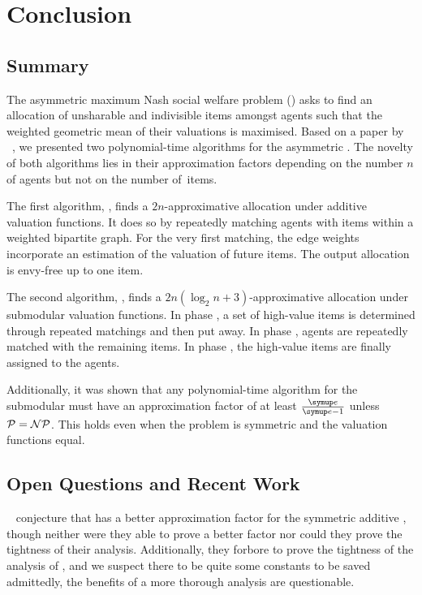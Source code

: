 \section{Conclusion}
\label{sec:conclusion}

\subsection{Summary}
\label{subsec:conclusion:summary}

The asymmetric maximum Nash social welfare problem (\NSW) asks to find an allocation of unsharable and indivisible items amongst agents such that the weighted geometric mean of their valuations is maximised.
Based on a paper by \citeauthor{APNSWuSVþUM}~\cite{APNSWuSVþUM}, we presented two polynomial-time algorithms for the asymmetric \NSW.
The novelty of both algorithms lies in their approximation factors depending on the number \(n\) of agents but not on the number of~items.

The first algorithm, \SMatch, finds a \(2n\)-approximative allocation under additive valuation functions.
It does so by repeatedly matching agents with items within a weighted bipartite graph.
For the very first matching, the edge weights incorporate an estimation of the valuation of future items.
The output allocation is envy-free up to one item.

The second algorithm, \RepReMatch, finds a \(2n(\log_2 n + 3)\)-approximative allocation under submodular valuation functions.
In phase \phasei, a set of high-value items is determined through repeated matchings and then put away.
In phase \phaseii, agents are repeatedly matched with the remaining items.
In phase \phaseiii, the high-value items are finally assigned to the agents.

Additionally, it was shown that any polynomial-time algorithm for the submodular \NSW{} must have an approximation factor of at least \(\frac{\euler}{\euler - 1}\) unless \(\mathcal{P} = \mathcal{N\kern-0.02em P}\).
This holds even when the problem is symmetric and the valuation functions equal.

\subsection{Open Questions and Recent Work}
\label{subsec:conclusion:outlook}

~\cite{APNSWuSVþUM} conjecture that \SMatch{} has a better approximation factor for the symmetric additive \NSW{}, though neither were they able to prove a better factor nor could they prove the tightness of their analysis.
Additionally, they forbore to prove the tightness of the analysis of \RepReMatch{}, and we suspect there to be quite some constants to be saved \Dash admittedly, the benefits of a more thorough analysis are questionable.


